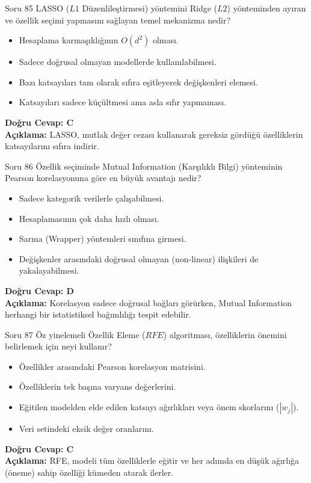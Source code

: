 \documentclass[12pt,a4paper]{article}
\begin{document}
\begin{testcard}{Soru 85}
    LASSO ($L1$ Düzenlileştirmesi) yöntemini Ridge ($L2$) yönteminden ayıran ve özellik seçimi yapmasını sağlayan temel mekanizma nedir?
    \begin{itemize}
        \item[A)] Hesaplama karmaşıklığının $O(d^2)$ olması.
        \item[B)] Sadece doğrusal olmayan modellerde kullanılabilmesi.
        \item[C)] Bazı katsayıları tam olarak sıfıra eşitleyerek değişkenleri elemesi.
        \item[D)] Katsayıları sadece küçültmesi ama asla sıfır yapmaması.
    \end{itemize}
    \tcblower
    \textbf{Doğru Cevap: C} \\
    \textbf{Açıklama:} LASSO, mutlak değer cezası kullanarak gereksiz gördüğü özelliklerin katsayılarını sıfıra indirir.
\end{testcard}

\begin{testcard}{Soru 86}
    Özellik seçiminde Mutual Information (Karşılıklı Bilgi) yönteminin Pearson korelasyonuna göre en büyük avantajı nedir?
    \begin{itemize}
        \item[A)] Sadece kategorik verilerle çalışabilmesi.
        \item[B)] Hesaplamasının çok daha hızlı olması.
        \item[C)] Sarma (Wrapper) yöntemleri sınıfına girmesi.
        \item[D)] Değişkenler arasındaki doğrusal olmayan (non-linear) ilişkileri de yakalayabilmesi.
    \end{itemize}
    \tcblower
    \textbf{Doğru Cevap: D} \\
    \textbf{Açıklama:} Korelasyon sadece doğrusal bağları görürken, Mutual Information herhangi bir istatistiksel bağımlılığı tespit edebilir.
\end{testcard}

\begin{testcard}{Soru 87}
    Öz yinelemeli Özellik Eleme ($RFE$) algoritması, özelliklerin önemini belirlemek için neyi kullanır?
    \begin{itemize}
        \item[A)] Özellikler arasındaki Pearson korelasyon matrisini.
        \item[B)] Özelliklerin tek başına varyans değerlerini.
        \item[C)] Eğitilen modelden elde edilen katsayı ağırlıkları veya önem skorlarını ($|w_j|$).
        \item[D)] Veri setindeki eksik değer oranlarını.
    \end{itemize}
    \tcblower
    \textbf{Doğru Cevap: C} \\
    \textbf{Açıklama:} RFE, modeli tüm özelliklerle eğitir ve her adımda en düşük ağırlığa (öneme) sahip özelliği kümeden atarak ilerler.
\end{testcard}
\end{document}

